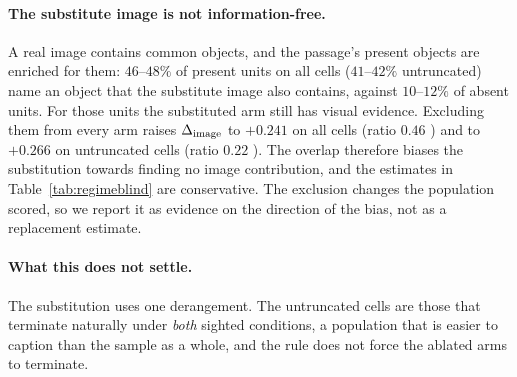 \paragraph{The substitute image is not information-free.} A real image contains common objects, and
the passage's present objects are enriched for them: $46$--$48\%$ of present units on all cells
($41$--$42\%$ untruncated) name an object that the substitute image also contains, against $10$--$12\%$
of absent units. For those units the substituted arm still has visual evidence. Excluding them from
every arm raises $\Delta_{\mathrm{image}}$ to $+0.241$  on all cells (ratio $0.46$
) and to $+0.266$  on untruncated cells (ratio $0.22$
). The overlap therefore biases the substitution towards finding no image
contribution, and the estimates in Table~\ref{tab:regimeblind} are conservative. The exclusion
changes the population scored, so we report it as evidence on the direction of the bias, not as a
replacement estimate.

\paragraph{What this does not settle.} The substitution uses one derangement. The untruncated cells are
those that terminate naturally under \emph{both} sighted conditions, a population that is easier to
caption than the sample as a whole, and the rule does not force the ablated arms to terminate.
